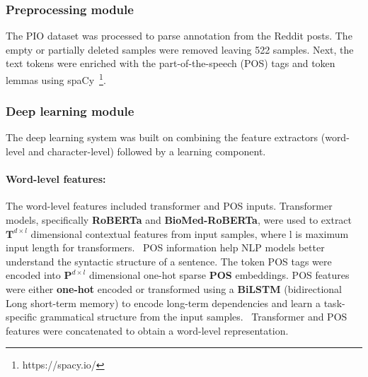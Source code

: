 \documentclass[11pt]{article}
\begin{document}
\subsubsection{Preprocessing module}
%
The PIO dataset was processed to parse annotation from the Reddit posts.
The empty or partially deleted samples were removed leaving 522 samples.
Next, the text tokens were enriched with the part-of-the-speech (POS) tags and token lemmas using spaCy~\footnote{https://spacy.io/}.
%
%
%
\subsubsection{Deep learning module}
%
%
%
The deep learning system was built on combining the feature extractors (word-level and character-level) followed by a learning component.
%
\paragraph{Word-level features: }
%
The word-level features included transformer and POS inputs.
Transformer models, specifically \textbf{RoBERTa} and \textbf{BioMed-RoBERTa}, were used to extract $\mathbf{T}^{d \times l}$ dimensional contextual features from input samples, where l is maximum input length for transformers.~\cite{liu2019roberta,gururangan2020don}
POS information help NLP models better understand the syntactic structure of a sentence.
The token POS tags were encoded into $\mathbf{P}^{d \times l}$ dimensional one-hot sparse \textbf{POS} embeddings.
POS features were either \textbf{one-hot} encoded or transformed using a \textbf{BiLSTM} (bidirectional Long short-term memory) to encode long-term dependencies and learn a task-specific grammatical structure from the input samples.~\cite{hochreiter1997long}
Transformer and POS features were concatenated to obtain a word-level representation.
\end{document}
